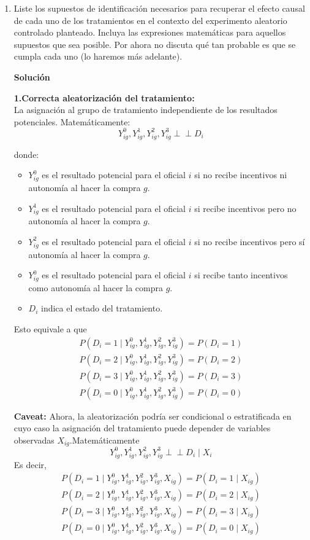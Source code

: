 \documentclass[a4paper, answers, addpoints, 11pt]{exam}
\newenvironment{solucion}{%
  \begin{mdframed}[
    backgroundcolor=blue!5,    %
    linecolor=blue!50,          %
    linewidth=2pt,              %
    leftmargin=10pt,            %
    rightmargin=8pt,           %
    topline=true,              %
    bottomline=true,            %
    roundcorner=10pt,           %
    innerleftmargin=10pt,       %
    innerrightmargin=10pt,      %
    innerbottommargin=10pt,     %
    innertopmargin=10pt         %
  ]%
  \begin{tcolorbox}[colframe=blue!50!black, colback=blue!50, coltitle=white, sharp corners=all, boxrule=1mm, width=\textwidth, halign=left, valign=center, top=0mm, bottom=0mm, left=0mm, right=0mm] \textbf{Solución} \end{tcolorbox} }{\end{mdframed}}
\begin{document}
\begin{enumerate}
    \item Liste los supuestos de identificación necesarios para recuperar el efecto causal de cada uno de los tratamientos en el contexto del experimento aleatorio controlado planteado. Incluya las expresiones matemáticas para aquellos supuestos que sea posible. Por ahora no discuta qué tan probable es que se cumpla cada uno (lo haremos más adelante). 
    \begin{solucion}
    \textbf{1.Correcta aleatorización del tratamiento:}\\
    La asignación al grupo de tratamiento independiente de los resultados potenciales. Matemáticamente:
   \[
Y_{ig}^0, Y_{ig}^1, Y_{ig}^2, Y_{ig}^3 \perp\!\!\!\perp D_i
\]

donde:
\begin{itemize}
    \item \( Y_{ig}^0 \) es el resultado potencial para el oficial \( i \) si no recibe incentivos ni autonomía al hacer la compra \( g \).
  \item \( Y_{ig}^1 \) es el resultado potencial para el oficial \( i \) si recibe incentivos pero no autonomía al hacer la compra \( g \).
  \item \( Y_{ig}^2 \) es el resultado potencial para el oficial \( i \) si no recibe incentivos pero sí autonomía al hacer la compra \( g \).
  \item \( Y_{ig}^0 \) es el resultado potencial para el oficial \( i \) si recibe tanto incentivos como autonomía al hacer la compra \( g \).
    \item \( D_i \) indica el estado del tratamiento.
\end{itemize}
Esto equivale a que \begin{gather*}
 P(D_i = 1 \mid Y_{ig}^0, Y_{ig}^1, Y_{ig}^2, Y_{ig}^3) = P(D_i = 1)\\
P(D_i = 2 \mid Y_{ig}^0, Y_{ig}^1, Y_{ig}^2, Y_{ig}^3) = P(D_i = 2)\\
P(D_i = 3 \mid Y_{ig}^0, Y_{ig}^1, Y_{ig}^2, Y_{ig}^3) = P(D_i = 3)\\
P(D_i = 0 \mid Y_{ig}^0, Y_{ig}^1, Y_{ig}^2, Y_{ig}^3) = P(D_i = 0)   
\end{gather*}

\begin{mdframed}[backgroundcolor=moraditoClaro]
\textbf{Caveat:} Ahora, la aleatorización podría ser condicional o estratificada en cuyo caso la asignación del tratamiento puede depender de variables observadas \(X_{ig}\).Matemáticamente \[
Y_{ig}^0, Y_{ig}^1, Y_{ig}^2, Y_{ig}^3 \perp\!\!\!\perp D_i \mid X_i
\]
Es decir,
\begin{gather*}
 P(D_i = 1 \mid Y_{ig}^0, Y_{ig}^1, Y_{ig}^2, Y_{ig}^3,X_{ig}) = P(D_i = 1\mid X_{ig})\\
P(D_i = 2 \mid Y_{ig}^0, Y_{ig}^1, Y_{ig}^2, Y_{ig}^3,X_{ig}) = P(D_i = 2\mid X_{ig})\\
P(D_i = 3 \mid Y_{ig}^0, Y_{ig}^1, Y_{ig}^2, Y_{ig}^3,X_{ig}) = P(D_i = 3\mid X_{ig})\\
P(D_i = 0 \mid Y_{ig}^0, Y_{ig}^1, Y_{ig}^2, Y_{ig}^3,X_{ig}) = P(D_i = 0\mid X_{ig})   
\end{gather*}


\end{mdframed}
\end{solucion}
\end{enumerate}
\end{document}
